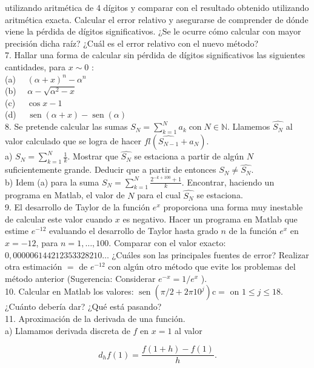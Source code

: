 \documentclass[10pt]{article}
\begin{document}
utilizando aritmética de 4 dígitos y comparar con el resultado obtenido utilizando aritmética exacta. Calcular el error relativo y asegurarse de comprender de dónde viene la pérdida de dígitos significativos. ¿Se le ocurre cómo calcular con mayor precisión dicha raíz? ¿Cuál es el error relativo con el nuevo método?\\
7. Hallar una forma de calcular sin pérdida de dígitos significativos las siguientes cantidades, para $x \sim 0$ :\\
(a) $\quad(\alpha+x)^{n}-\alpha^{n}$\\
(b) $\quad \alpha-\sqrt{\alpha^{2}-x}$\\
(c) $\quad \cos x-1$\\
(d) $\quad \operatorname{sen}(\alpha+x)-\operatorname{sen}(\alpha)$\\
8. Se pretende calcular las sumas $S_{N}=\sum_{k=1}^{N} a_{k} \operatorname{con} N \in \mathbb{N}$. Llamemos $\widehat{S_{N}}$ al valor calculado que se logra de hacer $f l\left(\widehat{S_{N-1}}+a_{N}\right)$.\\
a) $S_{N}=\sum_{k=1}^{N} \frac{1}{k}$. Mostrar que $\widehat{S_{N}}$ se estaciona a partir de algún $N$ suficientemente grande. Deducir que a partir de entonces $S_{N} \neq \widehat{S_{N}}$.\\
b) Idem (a) para la suma $S_{N}=\sum_{k=1}^{N} \frac{2^{-k+100}+1}{k}$. Encontrar, haciendo un programa en Matlab, el valor de $N$ para el cual $\widehat{S_{N}}$ se estaciona.\\
9. El desarrollo de Taylor de la función $e^{x}$ proporciona una forma muy inestable de calcular este valor cuando $x$ es negativo. Hacer un programa en Matlab que estime $e^{-12}$ evaluando el desarrollo de Taylor hasta grado $n$ de la función $e^{x}$ en $x=-12$, para $n=1, \ldots, 100$. Comparar con el valor exacto: $0,000006144212353328210 \ldots$ ¿Cuáles son las principales fuentes de error? Realizar otra estimación $=$ de $e^{-12}$ con algún otro método que evite los problemas del método anterior (Sugerencia: Considerar $e^{-x}=1 / e^{x}$ ).\\
10. Calcular en Matlab los valores: $\operatorname{sen}\left(\pi / 2+2 \pi 10^{j}\right) \mathrm{c}=$ on $1 \leq j \leq 18$. ¿Cuánto debería dar? ¿Qué está pasando?\\
11. Aproximación de la derivada de una función.\\
a) Llamamos derivada discreta de $f$ en $x=1$ al valor

$$
d_{h} f(1)=\frac{f(1+h)-f(1)}{h} .
$$
\end{document}
